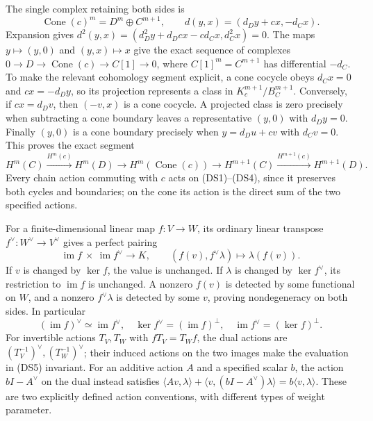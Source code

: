 The single complex retaining both sides is
\[
 \operatorname{Cone}(c)^m=D^m\oplus C^{m+1},\qquad
 d(y,x)=(d_Dy+cx,-d_Cx).
 \tag{DS3}
\]
Expansion gives $d^2(y,x)=(d_D^2y+d_Dcx-cd_Cx,d_C^2x)=0$.
The maps $y\mapsto(y,0)$ and $(y,x)\mapsto x$ give the exact sequence
of complexes $0\to D\to\operatorname{Cone}(c)\to C[1]\to0$, where
$C[1]^m=C^{m+1}$ has differential $-d_C$.  To make the relevant
cohomology segment explicit, a cone cocycle obeys
$d_Cx=0$ and $cx=-d_Dy$, so its projection represents a class in
$K_c^{m+1}/B_C^{m+1}$.  Conversely, if $cx=d_Dv$, then $(-v,x)$
is a cone cocycle.  A projected class is zero precisely when subtracting
a cone boundary leaves a representative $(y,0)$ with $d_Dy=0$.
Finally $(y,0)$ is a cone boundary precisely when
$y=d_Du+cv$ with $d_Cv=0$.  This proves the exact segment
\[
 H^m(C)\xrightarrow{H^m(c)} H^m(D)
 \longrightarrow H^m(\operatorname{Cone}(c))
 \longrightarrow H^{m+1}(C)\xrightarrow{H^{m+1}(c)}H^{m+1}(D).
 \tag{DS4}
\]
Every chain action commuting with $c$ acts on (DS1)--(DS4), since it
preserves both cycles and boundaries; on the cone its action is the
direct sum of the two specified actions.

For a finite-dimensional linear map $f:V\to W$, its ordinary linear
transpose $f^\vee:W^\vee\to V^\vee$ gives a perfect pairing
\[
 \operatorname{im}f\ \times\ \operatorname{im}f^\vee\longrightarrow K,
 \qquad (f(v),f^\vee\lambda)\longmapsto\lambda(f(v)).
 \tag{DS5}
\]
If $v$ is changed by $\ker f$, the value is unchanged.  If $\lambda$
is changed by $\ker f^\vee$, its restriction to $\operatorname{im}f$
is unchanged.  A nonzero $f(v)$ is detected by some functional on $W$,
and a nonzero $f^\vee\lambda$ is detected by some $v$, proving
nondegeneracy on both sides.  In particular
\[
 (\operatorname{im}f)^\vee\simeq\operatorname{im}f^\vee,
 \quad \ker f^\vee=(\operatorname{im}f)^\perp,
 \quad \operatorname{im}f^\vee=(\ker f)^\perp.
 \tag{DS6}
\]
For invertible actions $T_V,T_W$ with $fT_V=T_Wf$, the dual actions
are $(T_V^{-1})^\vee,(T_W^{-1})^\vee$; their induced actions on
the two images make the evaluation in (DS5) invariant.  For an additive
action $A$ and a specified scalar $b$, the action $bI-A^\vee$ on the
dual instead satisfies
$\langle Av,\lambda\rangle+\langle v,(bI-A^\vee)\lambda\rangle
=b\langle v,\lambda\rangle$.  These are two explicitly defined
action conventions, with different types of weight parameter.

